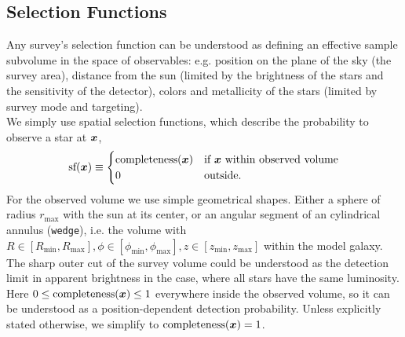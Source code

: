 \subsection{Selection Functions} \label{sec:selectionfunction}

Any survey's selection function can be understood as defining an effective sample subvolume in the space of observables: e.g. position on the plane of the sky (the survey area), distance from the sun (limited by the brightness of the stars and the sensitivity of the detector), colors and metallicity of the stars (limited by survey mode and targeting).
\\We simply use spatial selection functions, which describe the probability to observe a star at $\boldsymbol{x}$,
\begin{eqnarray*}
\text{sf}(\boldsymbol{x}) \equiv \begin{cases}
\text{completeness}(\boldsymbol{x}) &\text{if $\boldsymbol{x}$ within observed volume}\\
0 & \text{outside.}
\end{cases}
\end{eqnarray*}
For the observed volume we use simple geometrical shapes. Either a sphere of radius $r_\text{max}$ with the sun at its center, or an angular segment of an cylindrical annulus (\texttt{wedge}), i.e. the volume with $R \in [R_\text{min},R_\text{max}],\phi \in [\phi_\text{min},\phi_\text{max}],z \in [z_\text{min},z_\text{max}]$ within the model galaxy. The sharp outer cut of the survey volume could be understood as the detection limit in apparent brightness in the case, where all stars have the same luminosity. Here $0 \leq \text{completeness}(\boldsymbol{x}) \leq 1$ everywhere inside the observed volume, so it can be understood as a position-dependent detection probability. Unless explicitly stated otherwise, we simplify to $\text{completeness}(\boldsymbol{x}) = 1$.